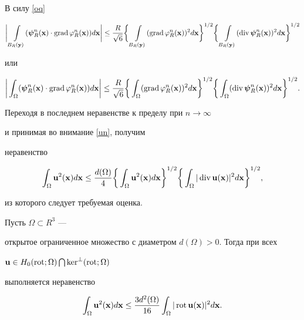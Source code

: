 \begin{pf}
В силу \eqref{oq}


$$


\bigg|\int\limits_{B_R(\bold{y})}(\boldsymbol{\psi}_R^n(\bold{x})\cdot


\Grad\varphi_R^n(\bold{x}))d\bold{x}\bigg|\leq 


\frac{R}{\sqrt{6}}\bigg\{\int\limits_{B_R (\bold{y})}(


\Grad\varphi_R^n(\bold{x}))^2d\bold


{x}\bigg\}^{1/2}\bigg\{\int\limits_{B_R(\bold{y})}(\Div


\boldsymbol{\psi}_R^n (\bold{x}))^2d\bold{x}\bigg\}^{1/2}


$$


или


$$


\bigg|\int_{\Omega}(\boldsymbol{\psi}_R^n(\bold{x})\cdot\Grad


\varphi_R^n(\bold{x}))d\bold{x}\bigg|\leq


\frac{R}{\sqrt{6}}\bigg\{\int_


{\Omega}(\Grad\varphi_R^n(\bold{x}))^2d\bold


{x}\bigg\}^{1/2}\bigg\{\int_{\Omega}(\Div\boldsymbol{\psi}_R^n


(\bold{x}))^2d\bold{x}\bigg\}^{1/2}.


$$


Переходя в последнем неравенстве к пределу при $n\to\infty$


и принимая во внимание \eqref{un}, получим


неравенство


$$


\int_{\Omega}\bold{u}^2(\bold{x})d\bold{x}\leq\frac{d(\Omega)}{4}


\bigg\{\int_{\Omega}\bold{u}^2(\bold{x})d\bold{x}\bigg\}^{1/2}


\bigg\{\int_{\Omega}|\Div\bold{u}(\bold{x})|^2d\bold{x}\bigg\}^{1/2},


$$


из которого следует требуемая оценка.


\end{pf}





\begin{thms}


Пусть $\Omega\subset R^3$ ---


открытое ограниченное множество с диаметром $d(\Omega)>0$. Тогда при всех


$\bold{u}\in H_0(\operatorname{rot};\Omega)\bigcap \ker^{\bot}(\operatorname{rot};\Omega)$


выполняется неравенство


$$


\int_{\Omega}\bold{u}^2(\bold{x})d\bold{x}\leq\frac{3d^2(\Omega)}{16}


\int_{\Omega}|\Rot\bold{u}(\bold{x})|^2d\bold{x}.


$$


\end{thms}





